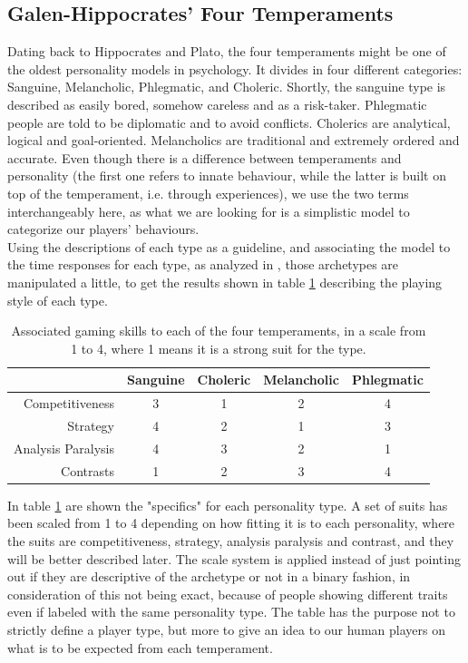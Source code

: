 \subsection{Galen-Hippocrates' Four Temperaments}\label{sec:hippocrates}
Dating back to Hippocrates and Plato, the four temperaments might be one of the oldest personality models in psychology. It divides in four different categories: Sanguine, Melancholic, Phlegmatic, and Choleric\cite{merenda1987toward}. 
Shortly, the sanguine type is described as easily bored, somehow careless and as a risk-taker. Phlegmatic people are told to be diplomatic and to avoid conflicts. Cholerics are analytical, logical and goal-oriented. Melancholics are traditional and extremely ordered and accurate.
Even though there is a difference between temperaments and personality (the first one refers to innate behaviour, while the latter is built on top of the temperament, i.e. through experiences), we use the two terms interchangeably here, as what we are looking for is a simplistic model to categorize our players' behaviours.\\
Using the descriptions of each type as a guideline, and associating the model to the time responses for each type, as analyzed in \cite{chiappelli2005evidence}, those archetypes are manipulated a little, to get the results shown in table \ref{tab:temperaments} describing the playing style of each type. 
\begin{table}[ht]
    \centering
	\caption{Associated gaming skills to each of the four temperaments, in a scale from 1 to 4, where 1 means it is a strong suit for the type.}
    \scriptsize
    \begin{tabular}{|r|c|c|c|c|}
    	\hline
                        & Sanguine & Choleric & Melancholic & Phlegmatic  \\
        \hline
        Competitiveness & 3        & 1        & 2           & 4           \\
        Strategy        & 4        & 2        & 1           & 3           \\
        Analysis Paralysis      & 4        & 3        & 2           & 1           \\
        Contrasts       & 1        & 2        & 3           & 4           \\
        \hline
    \end{tabular}
    \label{tab:temperaments}
\end{table}
In table \ref{tab:temperaments} are shown the "specifics" for each personality type. A set of suits has been scaled from 1 to 4 depending on how fitting it is to each personality, where the suits are competitiveness, strategy, analysis paralysis and contrast, and they will be better described later. The scale system is applied instead of just pointing out if they are descriptive of the archetype or not in a binary fashion, in consideration of this not being exact, because of people showing different traits even if labeled with the same personality type. The table has the purpose not to strictly define a player type, but more to give an idea to our human players on what is to be expected from each temperament.
